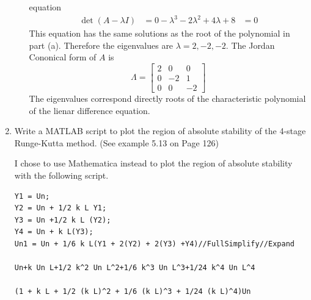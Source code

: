 \documentclass[11pt, oneside, titlepage]{article}
\begin{document}
\begin{enumerate}
\begin{enumerate}
                equation
                \begin{align*}
                    \det(A - \lambda I) &= 0
                    -\lambda^3 - 2\lambda^2 + 4\lambda + 8 &= 0
                \end{align*}
                This equation has the same solutions as the root of the
                polynomial in part (a).
                Therefore the eigenvalues are $\lambda = 2, -2, -2$.
                The Jordan Cononical form of $A$ is
                \[
                    \Lambda =
                    \begin{bmatrix}
                        2 & 0 & 0 \\
                        0 & -2 & 1 \\
                        0 & 0 & -2
                    \end{bmatrix}
                \]
                The eigenvalues correspond directly roots of the characteristic
                polynomial of the lienar difference equation.
        \end{enumerate}

    \item %
        Write a MATLAB script to plot the region of absolute stability of the
        4-stage Runge-Kutta method. (See example 5.13 on Page 126)

        I chose to use Mathematica instead to plot the region of absolute
        stability with the following script.
        \begin{verbatim}
Y1 = Un;
Y2 = Un + 1/2 k L Y1;
Y3 = Un +1/2 k L (Y2);
Y4 = Un + k L(Y3);
Un1 = Un + 1/6 k L(Y1 + 2(Y2) + 2(Y3) +Y4)//FullSimplify//Expand

Un+k Un L+1/2 k^2 Un L^2+1/6 k^3 Un L^3+1/24 k^4 Un L^4

(1 + k L + 1/2 (k L)^2 + 1/6 (k L)^3 + 1/24 (k L)^4)Un


\end{verbatim}
\end{enumerate}
\end{document}
